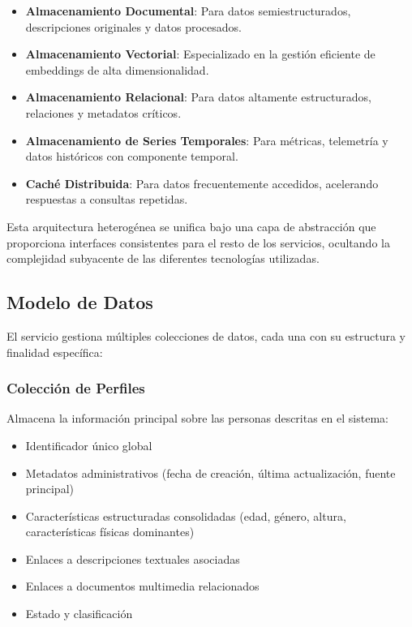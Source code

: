 \documentclass[12pt,a4paper]{article}
\begin{document}
\begin{itemize}
    \item \textbf{Almacenamiento Documental}: Para datos semiestructurados, descripciones originales y datos procesados.
    
    \item \textbf{Almacenamiento Vectorial}: Especializado en la gestión eficiente de embeddings de alta dimensionalidad.
    
    \item \textbf{Almacenamiento Relacional}: Para datos altamente estructurados, relaciones y metadatos críticos.
    
    \item \textbf{Almacenamiento de Series Temporales}: Para métricas, telemetría y datos históricos con componente temporal.
    
    \item \textbf{Caché Distribuida}: Para datos frecuentemente accedidos, acelerando respuestas a consultas repetidas.
\end{itemize}

Esta arquitectura heterogénea se unifica bajo una capa de abstracción que proporciona interfaces consistentes para el resto de los servicios, ocultando la complejidad subyacente de las diferentes tecnologías utilizadas.

\subsection{Modelo de Datos}
\label{subsec:ds-modelo-datos}

El servicio gestiona múltiples colecciones de datos, cada una con su estructura y finalidad específica:

\subsubsection{Colección de Perfiles}
Almacena la información principal sobre las personas descritas en el sistema:

\begin{itemize}
    \item Identificador único global
    \item Metadatos administrativos (fecha de creación, última actualización, fuente principal)
    \item Características estructuradas consolidadas (edad, género, altura, características físicas dominantes)
    \item Enlaces a descripciones textuales asociadas
    \item Enlaces a documentos multimedia relacionados
    \item Estado y clasificación
\end{itemize}
\end{document}
